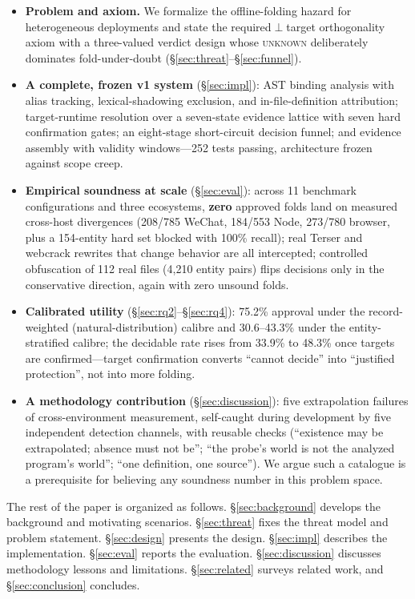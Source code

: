 \documentclass[sigconf,nonacm]{acmart}
\begin{document}
\begin{itemize}
  \item \textbf{Problem and axiom.} We formalize the offline-folding hazard for heterogeneous deployments and state the required$\perp$target orthogonality axiom with a three-valued verdict design whose \textsc{unknown} deliberately dominates fold-under-doubt (\S\ref{sec:threat}--\S\ref{sec:funnel}).
  \item \textbf{A complete, frozen v1 system} (\S\ref{sec:impl}): AST binding analysis with alias tracking, lexical-shadowing exclusion, and in-file-definition attribution; target-runtime resolution over a seven-state evidence lattice with seven hard confirmation gates; an eight-stage short-circuit decision funnel; and evidence assembly with validity windows---252 tests passing, architecture frozen against scope creep.
  \item \textbf{Empirical soundness at scale} (\S\ref{sec:eval}): across 11 benchmark configurations and three ecosystems, \textbf{zero} approved folds land on measured cross-host divergences (208/785 WeChat, 184/553 Node, 273/780 browser, plus a 154-entity hard set blocked with 100\% recall); real Terser and webcrack rewrites that change behavior are all intercepted; controlled obfuscation of 112 real files (4{,}210 entity pairs) flips decisions only in the conservative direction, again with zero unsound folds.
  \item \textbf{Calibrated utility} (\S\ref{sec:rq2}--\S\ref{sec:rq4}): 75.2\% approval under the record-weighted (natural-distribution) calibre and 30.6--43.3\% under the entity-stratified calibre; the decidable rate rises from 33.9\% to 48.3\% once targets are confirmed---target confirmation converts ``cannot decide'' into ``justified protection'', not into more folding.
  \item \textbf{A methodology contribution} (\S\ref{sec:discussion}): five extrapolation failures of cross-environment measurement, self-caught during development by five independent detection channels, with reusable checks (``existence may be extrapolated; absence must not be''; ``the probe's world is not the analyzed program's world''; ``one definition, one source''). We argue such a catalogue is a prerequisite for believing any soundness number in this problem space.
\end{itemize}

The rest of the paper is organized as follows. \S\ref{sec:background} develops the background and motivating scenarios. \S\ref{sec:threat} fixes the threat model and problem statement. \S\ref{sec:design} presents the design. \S\ref{sec:impl} describes the implementation. \S\ref{sec:eval} reports the evaluation. \S\ref{sec:discussion} discusses methodology lessons and limitations. \S\ref{sec:related} surveys related work, and \S\ref{sec:conclusion} concludes.
\end{document}
